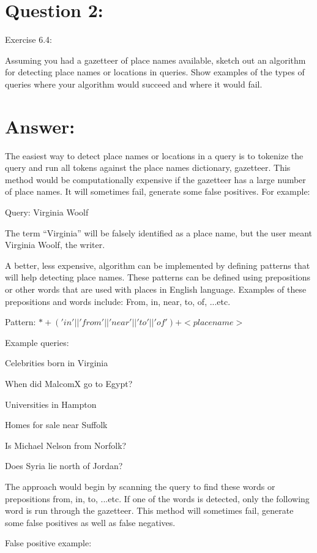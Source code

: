 \section*{Question 2:}
Exercise 6.4:

Assuming you had a gazetteer of place names available, sketch out an algorithm for detecting place names or locations in queries. Show examples of the types of queries where your algorithm would succeed and where it would fail.

\section*{Answer:}

The easiest way to detect place names or locations in a query is to tokenize the query and run all tokens against the place names dictionary, gazetteer. This method would be computationally expensive if the gazetteer has a large number of place names. It will sometimes fail, generate some false positives. For example:

Query: Virginia Woolf

The term ``Virginia'' will be falsely identified as a place name, but the user meant Virginia Woolf, the writer.

A better, less expensive, algorithm can be implemented by defining patterns that will help detecting place names. These patterns can be defined using prepositions or other words that are used with places in English language. Examples of these prepositions and words include: From, in, near, to, of, ...etc.

Pattern: $* + ('in' || 'from' || 'near' || 'to' || 'of' ) + <place name>$

Example queries:

Celebrities born in Virginia

When did MalcomX go to Egypt?

Universities in Hampton

Homes for sale near Suffolk  

Is Michael Nelson from Norfolk?

Does Syria lie north of Jordan?

The approach would begin by scanning the query to find these words or prepositions from, in, to, ...etc. If one of the words is detected, only the following word is run through the gazetteer. This method will sometimes fail, generate some false positives as well as false negatives. 

False positive example:


